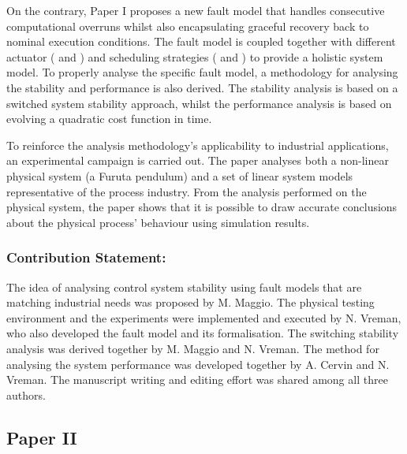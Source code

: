 On the contrary, Paper I proposes a new fault model that handles consecutive computational overruns whilst also encapsulating graceful recovery back to nominal execution conditions.
The fault model is coupled together with different actuator (\tZ{} and \tH{}) and scheduling strategies (\tK{} and \tS{}) to provide a holistic system model.
To properly analyse the specific fault model, a methodology for analysing the stability and performance is also derived.
The stability analysis is based on a switched system stability approach, whilst the performance analysis is based on evolving a quadratic cost function in time.

To reinforce the analysis methodology's applicability to industrial applications, an experimental campaign is carried out.
The paper analyses both a non-linear physical system (a Furuta pendulum) and a set of linear system models representative of the process industry.
From the analysis performed on the physical system, the paper shows that it is possible to draw accurate conclusions about the physical process' behaviour using simulation results.

\subsubsection*{Contribution Statement:}%
%
The idea of analysing control system stability using fault models that are matching industrial needs was proposed by M. Maggio.
The physical testing environment and the experiments were implemented and executed by N. Vreman, who also developed the fault model and its formalisation.
The switching stability analysis was derived together by M. Maggio and N. Vreman.
The method for analysing the system performance was developed together by A. Cervin and N. Vreman.
The manuscript writing and editing effort was shared among all three authors.


\subsection*{Paper II}%
%
\begin{quote}
\end{quote}

